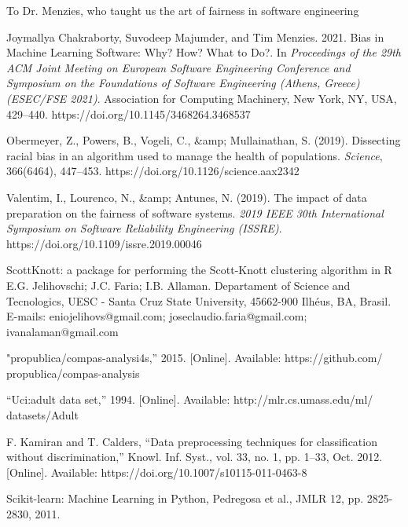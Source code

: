 \documentclass[sigconf]{acmart}
\begin{document}
\begin{acks}
To Dr. Menzies, who taught us the art of fairness in software engineering
\end{acks}

\begin{thebibliography}{9}
 Joymallya Chakraborty, Suvodeep Majumder, and Tim Menzies. 2021. Bias in Machine Learning Software: Why? How? What to Do?. In \emph{Proceedings of the 29th ACM Joint Meeting on European Software Engineering Conference and Symposium on the Foundations of Software Engineering (Athens, Greece) (ESEC/FSE 2021)}. Association for Computing Machinery, New York, NY, USA, 429–440. https://doi.org/10.1145/3468264.3468537

Obermeyer, Z., Powers, B., Vogeli, C., &amp; Mullainathan, S. (2019). Dissecting racial bias in an algorithm used to manage the health of populations. \emph{Science}, 366(6464), 447–453. https://doi.org/10.1126/science.aax2342 

Valentim, I., Lourenco, N., &amp; Antunes, N. (2019). The impact of data preparation on the fairness of software systems. \emph{2019 IEEE 30th International Symposium on Software Reliability Engineering (ISSRE)}. https://doi.org/10.1109/issre.2019.00046 

ScottKnott: a package for performing the Scott-Knott clustering algorithm in R E.G. Jelihovschi; J.C. Faria; I.B. Allaman. Departament of Science and Tecnologics, UESC - Santa Cruz State University, 45662-900 Ilhéus, BA, Brasil. E-mails: eniojelihovs@gmail.com; joseclaudio.faria@gmail.com; ivanalaman@gmail.com

"propublica/compas-analysi4s,” 2015. [Online]. Available: https://github.com/ propublica/compas-analysis


“Uci:adult data set,” 1994. [Online]. Available: http://mlr.cs.umass.edu/ml/ datasets/Adult

F. Kamiran and T. Calders, “Data preprocessing techniques for classification without discrimination,” Knowl. Inf. Syst., vol. 33, no. 1, pp. 1–33, Oct. 2012. [Online]. Available: https://doi.org/10.1007/s10115-011-0463-8

Scikit-learn: Machine Learning in Python, Pedregosa et al., JMLR 12, pp. 2825-2830, 2011.
\end{thebibliography}
\end{document}
